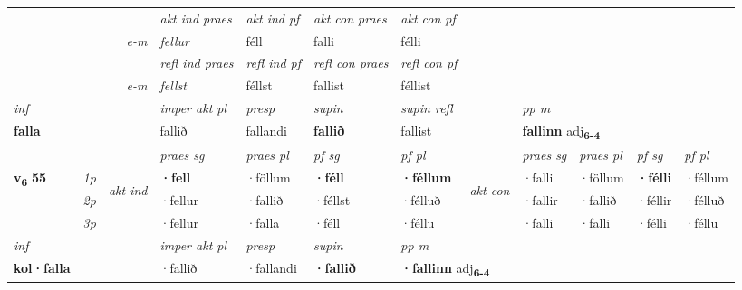 \begin{longtable}[l]{X>{\footnotesize\itshape}llXXXXlXXXX}
   && &  \textit{akt ind praes} & \textit{akt ind pf} & \textit{akt con praes} & \textit{akt con pf} \\*
\multicolumn{3}{r}{\textit{e-m}} & fellur & féll & falli & félli \\*

\cmidrule{4-7}
 & && \textit{refl ind praes} & \textit{refl ind pf} & \textit{refl con praes} & \textit{refl con pf} \\*
\multicolumn{3}{r}{\textit{e-m}}& fellst & féllst & fallist & féllist \\*

\cmidrule{4-7}
   {\textit{inf}} & &  & \textit{imper akt pl}   & \textit{presp} & \textit{supin} & \textit{supin refl} && \textit{pp m} \\*
  {\textbf{falla}} & &  & fallið   & fallandi &  \textbf{fallið} & fallist && \multicolumn{2}{l}{\textbf{fallinn} adj\textbf{\textsubscript{6-4}}} \\*

\midrule

 & &   & \textit{praes sg}  & \textit{praes pl}    & \textit{ pf sg} & \textit{pf pl} & & \textit{praes sg}  & \textit{praes pl}    & \textit{pf sg} & \textit{pf pl }  \\ \cmidrule{4-7} \cmidrule{9-12}
 \multirow{2}{*}{{{\textbf{v{\textsubscript{6}}} \Large{\textbf{55}}}}}  & 1p & \multirow{3}{*}{\begin{turn}{90}\textit{akt ind}\end{turn}} & \textbf{·fell} & ·föllum & \textbf{·féll} & \textbf{·féllum} & \multirow{3}{*}{\begin{turn}{90}\textit{akt con}\end{turn}} &·falli & ·föllum & \textbf{·félli} & ·féllum\\*
 & 2p &  &  ·fellur  & ·fallið & ·féllst & ·félluð & & ·fallir & ·fallið & ·féllir & ·félluð \\*
 & 3p &  & ·fellur & ·falla & ·féll & ·féllu & & ·falli & ·falli& ·félli & ·féllu \\*
\cmidrule{4-7} \cmidrule{9-12}

   {\textit{inf}} & &  & \textit{imper akt pl}   & \textit{presp} & \textit{supin}  & \textit{pp m} \\*
  {\textbf{kol\allowbreak ·falla}} & &  & ·fallið   & ·fallandi &  \textbf{·fallið}  & \multicolumn{2}{l}{\textbf{·fallinn} adj\textbf{\textsubscript{6-4}}} \\*

\midrule


\end{longtable}
